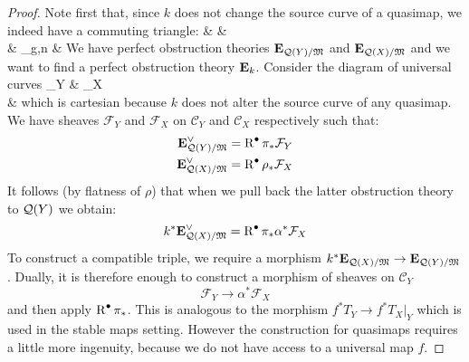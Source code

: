 \begin{proof} Note first that, since $k$ does not change the source curve of a quasimap, we indeed have a commuting triangle:
\bcd
{} \ar[rr,"k"] \ar[rd] & &  \ar[ld] \\
& \MM_{g,n} & 
\ecd
We have perfect obstruction theories $\mathbf{E}_{\mathcal{Q}(Y)/\mathfrak M}$ and $\mathbf{E}_{\mathcal{Q}(X)/\mathfrak M}$ and we want to find a perfect obstruction theory $\mathbf{E}_k$. Consider the diagram of universal curves
\bcd
{}_Y \ar[r,"\alpha"] \ar[d,"\pi"]  & _{X} \ar[d,"\rho"] \\
 \ar[r,"k"] & 
\ecd
which is cartesian because $k$ does not alter the source curve of any quasimap. We have sheaves $\mathcal{F}_Y$ and $\mathcal{F}_{X}$ on $\mathcal{C}_Y$ and $\mathcal{C}_{X}$ respectively such that:
\begin{align*} \mathbf{E}_{\mathcal{Q}(Y)/\mathfrak M}^\vee & = \operatorname{R}^{\bullet} \pi_* \mathcal{F}_Y \\
\mathbf{E}_{\mathcal{Q}(X)/\mathfrak M}^\vee & = \operatorname{R}^{\bullet} \rho_* \mathcal{F}_{X} \end{align*}
It follows (by flatness of $\rho$) that when we pull back the latter obstruction theory to $\mathcal{Q}(Y)$ we obtain:
\begin{equation*} k^* \mathbf{E}_{\mathcal{Q}(X)/\mathfrak M}^\vee = \operatorname{R}^{\bullet} \pi_* \alpha^* \mathcal{F}_{X} \end{equation*}
To construct a compatible triple, we require a morphism $k^* \mathbf{E}_{\mathcal{Q}(X)/\mathfrak M} \rightarrow \mathbf{E}_{\mathcal{Q}(Y)/\mathfrak M}$. Dually, it is therefore enough to construct a morphism of sheaves on $\mathcal{C}_Y$
\begin{equation*} \mathcal{F}_Y \to \alpha^* \mathcal{F}_{X} \end{equation*}
and then apply $\operatorname{R}^{\bullet} \pi_*$. This is analogous to the morphism $f^* T_Y \to f^* T_{X}|_Y$ which is used in the stable maps setting. However the construction for quasimaps requires a little more ingenuity, because we do not have access to a universal map $f$.


\end{proof}
